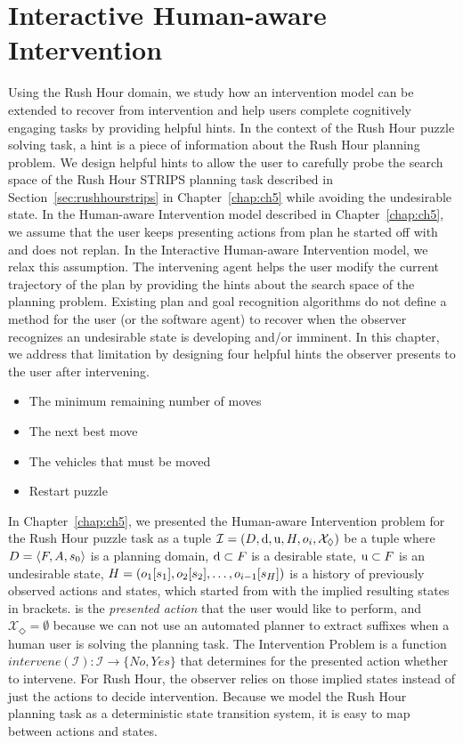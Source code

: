 \chapter{Interactive Human-aware Intervention}
\label{chap:ch6}
Using the Rush Hour domain, we study how an intervention model can be extended to recover from intervention and help users complete cognitively engaging tasks by providing helpful hints. 
In the context of the Rush Hour puzzle solving task, a hint is a piece of information about the Rush Hour planning problem. 
We design helpful hints to allow the user to carefully probe the search space of the Rush Hour STRIPS planning task described in Section~\ref{sec:rushhourstrips} in
Chapter~\ref{chap:ch5} while avoiding the undesirable state.
In the Human-aware Intervention model described in Chapter~\ref{chap:ch5}, we assume that the user keeps presenting actions from plan he started off with and does not replan.
In the Interactive Human-aware Intervention model, we relax this assumption.
The intervening agent helps the user modify the current trajectory of the plan by providing the hints about the search space of the planning problem.
Existing plan and goal recognition algorithms do not define a method for the user (or the software agent) to recover when the observer recognizes an undesirable state is developing and/or imminent.
In this chapter, we address that limitation by designing four helpful hints the observer presents to the user after intervening.
\begin{itemize}
\item The minimum remaining number of moves
\item The next best move
\item The vehicles that must be moved
\item Restart puzzle
\end{itemize}


In Chapter~\ref{chap:ch5}, we presented the Human-aware Intervention problem for the Rush Hour puzzle task as a tuple
$\mathcal{I} = (D, \mathrm{d}, \mathrm{u}, H, o_i, \mathcal{X}_\Diamond)$ be a tuple where
  $D=\langle F, A, s_0 \rangle$ is a planning domain,
  $\mathrm{d} \subset F$ is a desirable state,
  $\mathrm{u} \subset F$ is an undesirable state,
  $H = ( o_1 [s_1], o_2 [s_2], \ldots, o_{i-1} [s_{H}])$ is a history of previously observed actions and states, which started from \initialState with the implied resulting states in brackets.
  \presentedAction is the \emph{presented action} that the user would like to perform, and
  $\mathcal{X}_\Diamond = \emptyset$ because we can not use an automated planner to extract suffixes when a human user is solving the planning task.
The \textnormal{Intervention Problem} is a function $intervene (\mathcal{I}) :  \mathcal{I} \rightarrow \{No, Yes\} $
that determines for the presented action \presentedAction whether to intervene.
For Rush Hour, the observer relies on those implied states instead of just the actions to decide intervention.
Because we model the Rush Hour planning task as a deterministic state transition system,  it is easy to map between actions and states.


